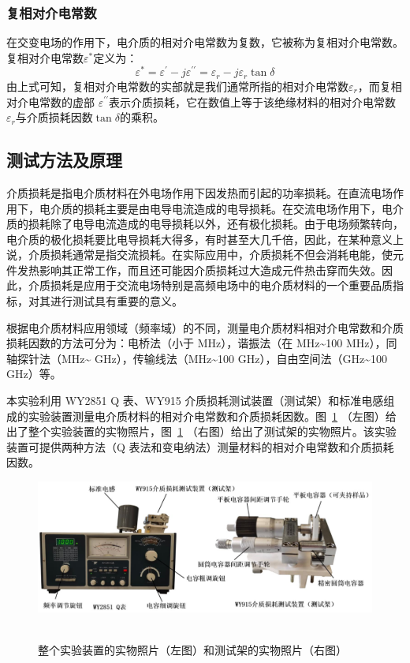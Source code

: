 \documentclass[a4paper,utf8]{article}
\newcommand{\fgref}[1]{图~\ref{#1} }
\begin{document}
        \subsubsection{复相对介电常数}
        在交变电场的作用下，电介质的相对介电常数为复数，它被称为复相对介电常数。复相对介电常数$\varepsilon^*$定义为：
        \begin{equation}
            \varepsilon^*=\varepsilon^{\prime}-j\varepsilon^{\prime\prime}=\varepsilon_r-j\varepsilon_r\tan\delta 
        \end{equation}
        由上式可知，复相对介电常数的实部就是我们通常所指的相对介电常数$\varepsilon_r$，而复相对介电常数的虚部 $\varepsilon^{\prime\prime}$表示介质损耗，它在数值上等于该绝缘材料的相对介电常数$\varepsilon_r$与介质损耗因数$\tan\delta$的乘积。
    \subsection{测试方法及原理}
        介质损耗是指电介质材料在外电场作用下因发热而引起的功率损耗。在直流电场作用下，电介质的损耗主要是由电导电流造成的电导损耗。在交流电场作用下，电介质的损耗除了电导电流造成的电导损耗以外，还有极化损耗。由于电场频繁转向，电介质的极化损耗要比电导损耗大得多，有时甚至大几千倍，因此，在某种意义上说，介质损耗通常是指交流损耗。在实际应用中，介质损耗不但会消耗电能，使元件发热影响其正常工作，而且还可能因介质损耗过大造成元件热击穿而失效。因此，介质损耗是应用于交流电场特别是高频电场中的电介质材料的一个重要品质指标，对其进行测试具有重要的意义。\par
        根据电介质材料应用领域（频率域）的不同，测量电介质材料相对介电常数和介质损耗因数的方法可分为：电桥法（小于 \unit{\mega\hertz}），谐振法（在 \unit{\mega\hertz}\~{}100 \unit{\mega\hertz}），同轴探针法\linebreak（\unit{\mega\hertz}\~{} \unit{\giga\hertz}），传输线法（\unit{\mega\hertz}\~{}100 \unit{\giga\hertz}），自由空间法（\unit{\giga\hertz}\~{}100 \unit{\giga\hertz}）等。\par
        本实验利用 WY2851 Q 表、WY915 介质损耗测试装置（测试架）和标准电感组成的实验装置测量电介质材料的相对介电常数和介质损耗因数。\fgref{fig:3}（左图）给出了整个实验装置的实物照片，\fgref{fig:3}（右图）给出了测试架的实物照片。该实验装置可提供两种方法（Q 表法和变电纳法）测量材料的相对介电常数和介质损耗因数。
        \begin{figure}[!ht]
            \includegraphics[width=\textwidth]{fg3.jpg}\
            \caption{整个实验装置的实物照片（左图）和测试架的实物照片（右图）\label{fig:3}}
        \end{figure}
\end{document}
